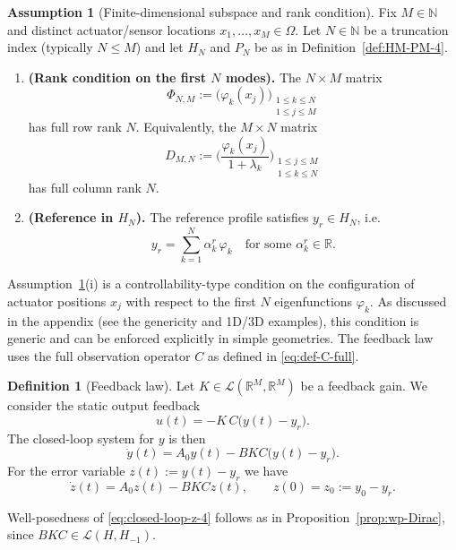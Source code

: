 \documentclass[11pt,a4paper]{article}
\numberwithin{equation}{section}
\theoremstyle{definition}
\newtheorem{definition}[theorem]{Definition}
\newtheorem{assumption}[theorem]{Assumption}
\newcommand{\1}{\mathbbm{1}}
\begin{document}
\begin{assumption}[Finite-dimensional subspace and rank condition]\label{ass:rank-4}
Fix $M\in\mathbb N$ and distinct actuator/sensor locations $x_1,\dots,x_M\in\Omega$.
Let $N\in\mathbb N$ be a truncation index (typically $N\le M$) and let $H_N$ and $P_N$
be as in Definition~\ref{def:HM-PM-4}.

\begin{enumerate}
\item[(i)] \textbf{(Rank condition on the first $N$ modes).}
The $N\times M$ matrix
\[
\Phi_{N,M}:=\big(\varphi_k(x_j)\big)_{\substack{1\le k\le N\\ 1\le j\le M}}
\]
has full row rank $N$.
Equivalently, the $M\times N$ matrix
\[
D_{M,N}:=\Big(\frac{\varphi_k(x_j)}{1+\lambda_k}\Big)_{\substack{1\le j\le M\\ 1\le k\le N}}
\]
has full column rank $N$.

\item[(ii)] \textbf{(Reference in $H_N$).}
The reference profile satisfies $y_r\in H_N$, i.e.
\[
y_r=\sum_{k=1}^N \alpha_k^r\,\varphi_k
\quad\text{for some }\alpha_k^r\in\mathbb R.
\]
\end{enumerate}
\end{assumption}
\noindent
Assumption~\ref{ass:rank-4}(i) is a controllability-type condition on the
configuration of actuator positions $x_j$ with respect to the first $N$
eigenfunctions $\varphi_k$. As discussed in the appendix (see the genericity and 1D/3D
examples), this condition is generic and can be enforced explicitly in simple
geometries.
\newline
The feedback law uses the full observation operator $C$ as defined in
\eqref{eq:def-C-full}.

\begin{definition}[Feedback law]
\label{def:feedback-law-4}
Let $K\in\mathcal{L}(\mathbb{R}^M,\mathbb{R}^M)$ be a feedback gain. We
consider the static output feedback
\begin{equation}
\label{eq:feedback-fullC}
u(t) = -K\,C\big(y(t)-y_r\big).
\end{equation}
The closed-loop system for $y$ is then
\begin{equation}
\label{eq:closed-loop-y-4}
\dot y(t) = A_0 y(t) - B K C\big(y(t)-y_r\big).
\end{equation}
For the error variable $z(t):=y(t)-y_r$ we have
\begin{equation}
\label{eq:closed-loop-z-4}
\dot z(t) = A_0 z(t) - B K C z(t),\qquad z(0)=z_0:=y_0-y_r.
\end{equation}
\end{definition}
\noindent
Well-posedness of \eqref{eq:closed-loop-z-4} follows as in
Proposition~\ref{prop:wp-Dirac}, since $BKC\in\mathcal{L}(H,H_{-1})$.
\end{document}
